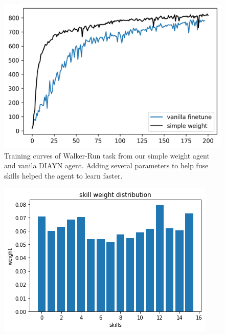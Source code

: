 \begin{figure}[ht]
  \vskip 0.2in
  \begin{center}
  \centerline{\includegraphics[width=\columnwidth]{Figures/walker_run_simple_weight.png}}
  \caption{Training curves of Walker-Run task from our simple weight agent and vanila DIAYN agent.
  Adding several parameters to help fuse skills helped the agent to learn faster.}
  \label{walker-run-simple-weight}
  \end{center}
  \vskip -0.2in
  \end{figure}


  \begin{figure}[ht]
    \vskip 0.2in
    \begin{center}
    \centerline{\includegraphics[width=\columnwidth]{Figures/skill_weight.png}}
    \caption{}
    \label{final_skill_weight}
    \end{center}
    \vskip -0.2in
    \end{figure}

